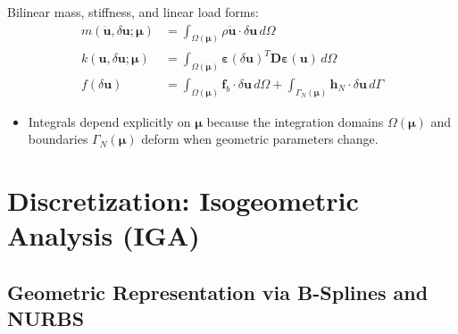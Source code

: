\documentclass[12pt,a4paper,oneside]{report}
\newcommand{\vect}[1]{\mathbf{#1}}
\newcommand{\mat}[1]{\mathbf{#1}}
\begin{document}
Bilinear mass, stiffness, and linear load forms:
\begin{align}
    m(\ddot{\vect{u}}, \delta\vect{u}; \boldsymbol{\mu}) & = \int_{\Omega(\boldsymbol{\mu})} \rho \ddot{\vect{u}} \cdot \delta\vect{u} \, d\Omega                                                                      \\
    k(\vect{u}, \delta\vect{u}; \boldsymbol{\mu})        & = \int_{\Omega(\boldsymbol{\mu})} \boldsymbol{\varepsilon}(\delta\vect{u})^T \mat{D} \boldsymbol{\varepsilon}(\vect{u}) \, d\Omega                          \\
    f(\delta\vect{u})                                    & = \int_{\Omega(\boldsymbol{\mu})} \vect{f}_b \cdot \delta\vect{u} \, d\Omega + \int_{\Gamma_N(\boldsymbol{\mu})} \vect{h}_N \cdot \delta\vect{u} \, d\Gamma
\end{align}
\begin{tcolorbox}[colback=gray!5!white,colframe=gray!60!black,title={Term Definitions \& Parameter Dependencies}]
\begin{itemize}
    \item Integrals depend explicitly on $\boldsymbol{\mu}$ because the integration domains $\Omega(\boldsymbol{\mu})$ and boundaries $\Gamma_N(\boldsymbol{\mu})$ deform when geometric parameters change.
\end{itemize}
\end{tcolorbox}


\chapter{Discretization: Isogeometric Analysis (IGA)}
\label{ch:discretization}

\section{Geometric Representation via B-Splines and NURBS}
\end{document}
